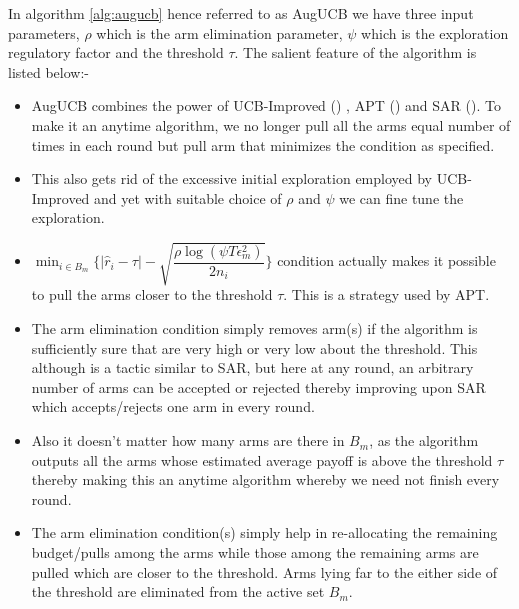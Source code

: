 In algorithm \ref{alg:augucb} hence referred to as AugUCB we have three input parameters, $\rho$ which is the arm elimination parameter, $\psi$ which is the exploration regulatory factor and the threshold $\tau$. The salient feature of the algorithm is listed below:-
\begin{itemize}
\item AugUCB combines the power of UCB-Improved (\cite{auer2010ucb}) , APT (\cite{locatelli2016optimal}) and SAR (\cite{gabillon2011multi}). To make it an anytime algorithm, we no longer pull all the arms equal number of times in each round but pull arm that minimizes the condition as specified.
\item This also gets rid of the excessive initial exploration employed by UCB-Improved and yet with suitable choice of $\rho$ and $\psi$ \cite{liu2016modification} we can fine tune the exploration.
\item $\min_{i\in B_{m}}\bigg\lbrace |\hat{r}_{i} - \tau | - \sqrt{\dfrac{\rho \log (\psi T \epsilon_{m}^{2})}{2 n_{i}}} \bigg\rbrace$ condition actually makes it possible to pull the arms closer to the threshold $\tau$. This is a strategy used by APT.
\item The arm elimination condition simply removes arm(s) if the algorithm is sufficiently sure that are very high or very low about the threshold. This although is a tactic similar to SAR, but here at any round, an arbitrary number of arms can be accepted or rejected thereby improving upon SAR which accepts/rejects one arm in every round.
\item Also it doesn't matter how many arms are there in $B_{m}$, as the algorithm outputs all the arms whose estimated average payoff is above the threshold $\tau$ thereby making this an anytime algorithm whereby we need not finish every round.
\item The arm elimination condition(s) simply help in re-allocating the remaining budget/pulls among the arms while those among the remaining arms are pulled which are closer to the threshold. Arms lying far to the either side of the threshold are eliminated from the active set $B_{m}$.
\end{itemize}